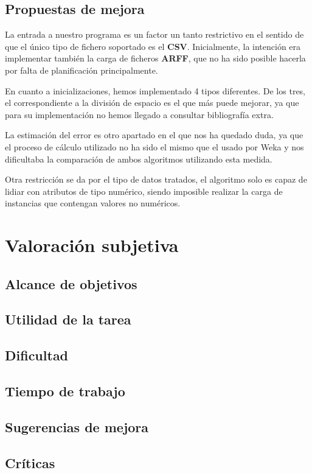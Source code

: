 \documentclass[a4paper]{report}
\begin{document}
	\section{Propuestas de mejora}
	
	La entrada a nuestro programa es un factor un tanto restrictivo en el sentido de que el único tipo de fichero soportado es el \textbf{CSV}. Inicialmente, la intención era implementar también la carga de ficheros \textbf{ARFF}, que no ha sido posible hacerla por falta de planificación principalmente.
	
	En cuanto a inicializaciones, hemos implementado 4 tipos diferentes. De los tres, el correspondiente a la división de espacio es el que más puede mejorar, ya que para su implementación no hemos llegado a consultar bibliografía extra.
	
	La estimación del error es otro apartado en el que nos ha quedado duda, ya que el proceso de cálculo utilizado no ha sido el mismo que el usado por Weka y nos dificultaba la comparación de ambos algoritmos utilizando esta medida.
	
	Otra restricción se da por el tipo de datos tratados, el algoritmo solo es capaz de lidiar con atributos de tipo numérico, siendo imposible realizar la carga de instancias que contengan valores no numéricos.


\newpage




\newpage


\chapter{Valoración subjetiva}
	
	\section*{Alcance de objetivos}
	
	\section*{Utilidad de la tarea}
	
	\section*{Dificultad}
	
	\section*{Tiempo de trabajo}
	
	\section*{Sugerencias de mejora}
	
	\section*{Críticas}
\end{document}
